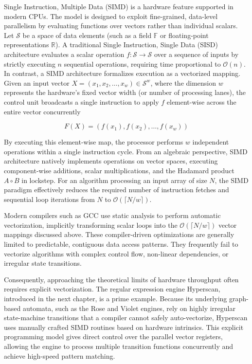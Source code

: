 Single Instruction, Multiple Data (SIMD) is a hardware feature supported in modern CPUs. The model is designed to exploit fine-grained, data-level parallelism by evaluating functions over vectors rather than individual scalars. Let $\mathcal{S}$ be a space of data elements (such as a field $\mathbb{F}$ or floating-point representations $\mathbb{R}$). A traditional Single Instruction, Single Data (SISD) architecture evaluates a scalar operation $f: \mathcal{S} \to \mathcal{S}$ over a sequence of inputs by strictly executing $n$ sequential operations, requiring time proportional to $\mathcal{O}(n)$. In contrast, a SIMD architecture formalizes execution as a vectorized mapping. Given an input vector $X = (x_1, x_2, \dots, x_w) \in \mathcal{S}^w$, where the dimension $w$ represents the hardware's fixed vector width (or number of processing lanes), the control unit broadcasts a single instruction to apply $f$ element-wise across the entire vector concurrently

$$F(X) = (f(x_1), f(x_2), \dots, f(x_w))$$

By executing this element-wise map, the processor performs $w$ independent operations within a single instruction cycle. From an algebraic perspective, SIMD architecture natively implements operations on vector spaces, executing component-wise additions, scalar multiplications, and the Hadamard product $A \circ B$ in lockstep. For an algorithm processing an input array of size $N$, the SIMD paradigm effectively reduces the required number of instruction fetches and sequential loop iterations from $N$ to $\mathcal{O}(\lceil N/w \rceil)$.

Modern compilers such as GCC use static analysis to perform automatic vectorization, implicitly transforming scalar loops into the $\mathcal{O}(\lceil N/w \rceil)$ vector mappings discussed above. These compiler-driven optimizations are generally limited to predictable, contiguous data access patterns. They frequently fail to vectorize algorithms with complex control flow, non-linear dependencies, or irregular state transitions.

Consequently, approaching the theoretical limits of hardware throughput often requires explicit vectorization. The regular expression engine Hyperscan, introduced in the next chapter, is a prime example. Because its underlying graph-based automata, such as the Rose and Violet engines, rely on highly irregular state-machine transitions that a compiler cannot safely auto-vectorize, Hyperscan uses manually crafted SIMD routines based on hardware intrinsics. This explicit programming model gives direct control over the parallel vector registers, allowing the engine to process multiple transition functions concurrently and achieve high-speed pattern matching.

